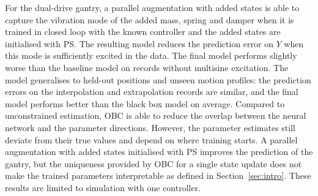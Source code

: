 For the dual-drive gantry,
a parallel augmentation with added states
is able to capture the vibration mode of the added mass, spring and damper when
it is trained in closed loop with the known controller and
the added states are initialised with PS.
The resulting model reduces the prediction error on $Y$
when this mode is sufficiently excited in the data.
The final model performs slightly worse than the baseline model on records without
multisine excitation.
The model generalises to held-out positions and unseen motion profiles:
the prediction errors on the interpolation and extrapolation records are similar,
and the final model performs better than the black box model on average.
Compared to unconstrained estimation,
OBC is able to reduce the overlap between the neural network and the parameter directions.
However, the parameter estimates still deviate from their true
values and depend on where training starts.
A parallel augmentation with added states initialised with
PS improves the prediction of the gantry, but the uniqueness provided by
OBC for a single state update does not make the trained parameters
interpretable as defined in Section~\ref{sec:intro}.
These results are limited to simulation with one controller.
